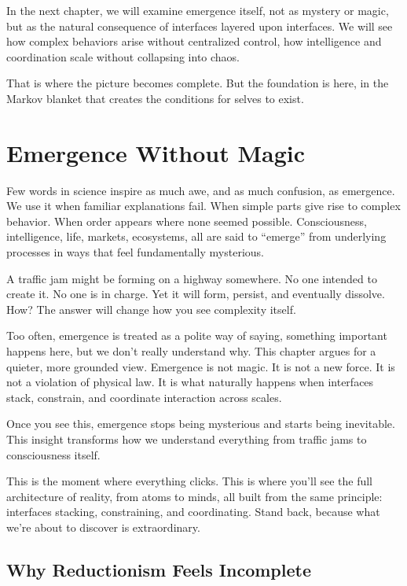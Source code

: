 \documentclass[
  openright]{book}
\begin{document}
In the next chapter, we will examine emergence itself, not as mystery or
magic, but as the natural consequence of interfaces layered upon
interfaces. We will see how complex behaviors arise without centralized
control, how intelligence and coordination scale without collapsing into
chaos.

That is where the picture becomes complete. But the foundation is here,
in the Markov blanket that creates the conditions for selves to exist.

\chapter{\texorpdfstring{Emergence Without
Magic}{Emergence Without Magic}}\label{emergence-without-magic-1}

Few words in science inspire as much awe, and as much confusion, as
emergence. We use it when familiar explanations fail. When simple parts
give rise to complex behavior. When order appears where none seemed
possible. Consciousness, intelligence, life, markets, ecosystems, all
are said to ``emerge'' from underlying processes in ways that feel
fundamentally mysterious.

A traffic jam might be forming on a highway somewhere. No one intended
to create it. No one is in charge. Yet it will form, persist, and
eventually dissolve. How? The answer will change how you see complexity
itself.

Too often, emergence is treated as a polite way of saying, something
important happens here, but we don't really understand why. This chapter
argues for a quieter, more grounded view. Emergence is
not magic. It is not a new force. It is not a violation of physical law.
It is what naturally happens when interfaces stack,
constrain, and coordinate interaction across scales.

Once you see this, emergence stops being mysterious and starts being
inevitable. This insight transforms how we understand everything from
traffic jams to consciousness itself.

This is the moment where everything clicks. This is where you'll see the
full architecture of reality, from atoms to minds, all built from the
same principle: interfaces stacking, constraining, and coordinating.
Stand back, because what we're about to discover is extraordinary.

\section{Why Reductionism Feels
Incomplete}\label{why-reductionism-feels-incomplete}
\end{document}

